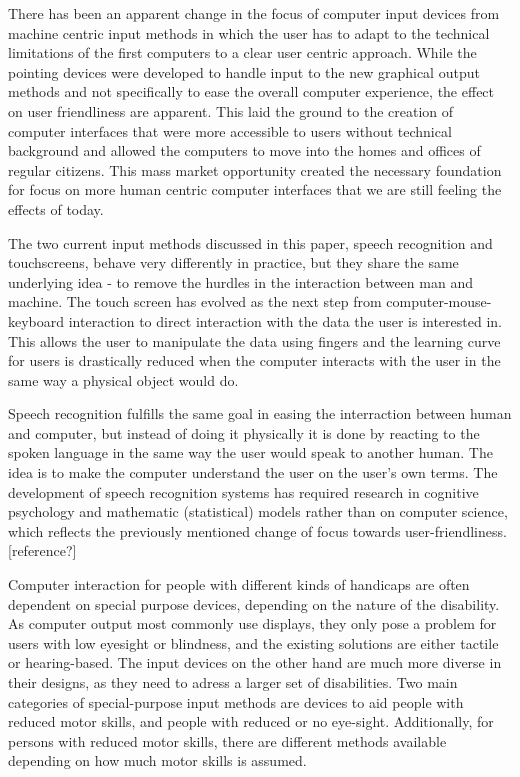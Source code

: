 There has been an apparent change in the focus of computer input devices from machine centric input methods in which the user has to adapt to the technical limitations of the first computers to a clear user centric approach. While the pointing devices were developed to handle input to the new graphical output methods and not specifically to ease the overall computer experience, the effect on user friendliness are apparent. This laid the ground to the creation of computer interfaces that were more accessible to users without technical background and allowed the computers to move into the homes and offices of regular citizens. This mass market opportunity created the necessary foundation for focus on more human centric computer interfaces that we are still feeling the effects of today.


The two current input methods discussed in this paper, speech recognition and touchscreens, behave very differently in practice, but they share the same underlying idea - to remove the hurdles in the interaction between man and machine. The touch screen has evolved as the next step from computer-mouse-keyboard interaction to direct interaction with the data the user is interested in. This allows the user to manipulate the data using fingers and the learning curve for users is drastically reduced when the computer interacts with the user in the same way a physical object would do.

Speech recognition fulfills the same goal in easing the interraction between human and computer, but instead of doing it physically it is done by reacting to the spoken language in the same way the user would speak to another human. The idea is to make the computer understand the user on the user's own terms. The development of speech recognition systems has required research in cognitive psychology and mathematic (statistical) models rather than on computer science, which reflects the previously mentioned change of focus towards user-friendliness.[reference?] 


Computer interaction for people with different kinds of handicaps are often dependent on special purpose devices, depending on the nature of the disability. As computer output most commonly use displays, they only pose a problem for users with low eyesight or blindness, and the existing solutions are either tactile or hearing-based. The input devices on the other hand are much more diverse in their designs, as they need to adress a larger set of disabilities. Two main categories of special-purpose input methods are devices to aid people with reduced motor skills, and people with reduced or no eye-sight. Additionally, for persons with reduced motor skills, there are different methods available depending on how much motor skills is assumed.

